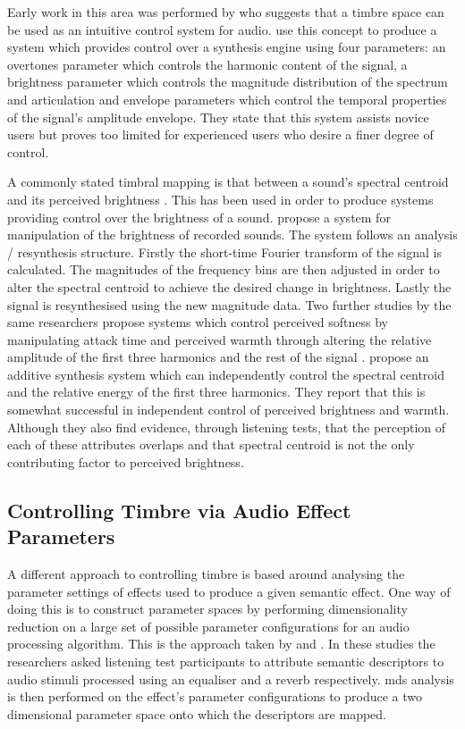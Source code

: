		Early work in this area was performed by \citet{wessel1979timbre} who suggests that a timbre space can be
		used as an intuitive control system for audio. \citet{vertegaal1994isee} use this concept to produce a
		system which provides control over a synthesis engine using four parameters: an overtones parameter which
		controls the harmonic content of the signal, a brightness parameter which controls the magnitude
		distribution of the spectrum and articulation and envelope parameters which control the temporal properties
		of the signal's amplitude envelope. They state that this system assists novice users but proves too limited
		for experienced users who desire a finer degree of control.

		A commonly stated timbral mapping is that between a sound's spectral centroid and its perceived brightness
		\citep{schubert2006does}. This has been used in order to produce systems providing control over the
		brightness of a sound. \citet{williams2007perceptually} propose a system for manipulation of the brightness
		of recorded sounds. The system follows an analysis / resynthesis structure. Firstly the short-time Fourier
		transform of the signal is calculated. The magnitudes of the frequency bins are then adjusted in order to
		alter the spectral centroid to achieve the desired change in brightness. Lastly the signal is resynthesised
		using the new magnitude data.  Two further studies by the same researchers propose systems which control
		perceived softness by manipulating attack time \citep{williams2009perceptually} and perceived warmth
		through altering the relative amplitude of the first three harmonics and the rest of the signal
		\citep{williams2010perceptually}. \citet{zacharakis2011an} propose an additive synthesis system which can
		independently control the spectral centroid and the relative energy of the first three harmonics. They
		report that this is somewhat successful in independent control of perceived brightness and warmth. Although
		they also find evidence, through listening tests, that the perception of each of these attributes overlaps
		and that spectral centroid is not the only contributing factor to perceived brightness.

	\subsection{Controlling Timbre via Audio Effect Parameters}
	\label{sec:Timbre-Control-ParameterSpaces}
		A different approach to controlling timbre is based around analysing the parameter settings of effects used
		to produce a given semantic effect. One way of doing this is to construct parameter spaces by performing
		dimensionality reduction on a large set of possible parameter configurations for an audio processing
		algorithm. This is the approach taken by \citet{cartwright2013socialeq} and
		\citet{seetharaman2014crowdsourcing}. In these studies the researchers asked listening test participants to
		attribute semantic descriptors to audio stimuli processed using an equaliser and a reverb respectively.
		\acrshort{mds} analysis is then performed on the effect's parameter configurations to produce a two
		dimensional parameter space onto which the descriptors are mapped.

